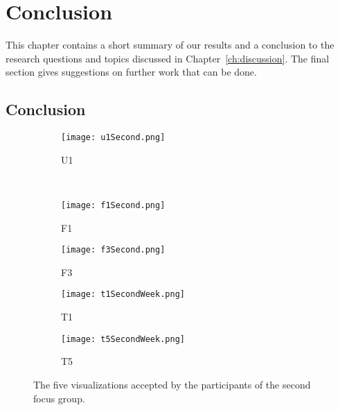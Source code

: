 \chapter{Conclusion}
This chapter contains a short summary of our results and a conclusion to the research questions and topics discussed in Chapter~\ref{ch:discussion}. The final section gives suggestions on further work that can be done.
\section{Conclusion}

\begin{figure}[h!]
  \begin{subfigure}[b]{0.4\textwidth}
    \centering
    \texttt{[image: u1Second.png]}
    \caption{U1}
  \end{subfigure} 
  \\
  \begin{subfigure}[b]{0.49\textwidth}
    \centering
    \texttt{[image: f1Second.png]}
    \caption{F1}
  \end{subfigure} 
  \begin{subfigure}[b]{0.49\textwidth}
    \centering
    \texttt{[image: f3Second.png]}
    \caption{F3}
  \end{subfigure}
  \begin{subfigure}[b]{0.49\textwidth}
    \centering
    \texttt{[image: t1SecondWeek.png]}
    \caption{T1}
  \end{subfigure} 
  \begin{subfigure}[b]{0.49\textwidth}
    \centering
    \texttt{[image: t5SecondWeek.png]}
    \caption{T5}
  \end{subfigure}
  \caption{The five visualizations accepted by the participants of the second focus group.}
  \label{fig:visualizations}
\end{figure}

